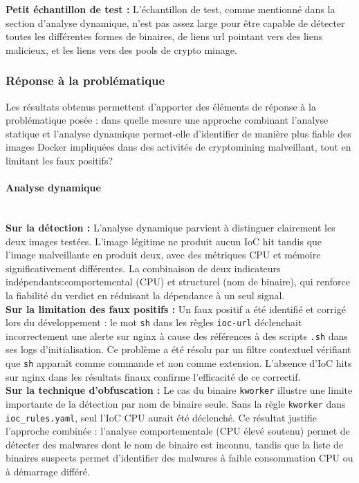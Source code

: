 \noindent \textbf{Petit échantillon de test :} L'échantillon de test, comme mentionné dans la section d'analyse dynamique, n'est pas assez large pour être capable de détecter toutes les différentes formes de binaires, de liens url pointant vers des liens malicieux, et les liens vers des pools de crypto minage. \\
\subsubsection{Réponse à la problématique}
Les résultats obtenus permettent d'apporter des éléments de réponse à la problématique posée : dans quelle mesure une approche combinant l'analyse statique et l'analyse dynamique permet-elle d'identifier de manière plus fiable des images Docker impliquées dans des activités de cryptomining malveillant, tout en limitant les faux positifs?

\noindent \paragraph{Analyse dynamique} \mbox{} \\
\noindent \textbf{Sur la détection :} L'analyse dynamique parvient à distinguer clairement les deux images testées. L'image légitime ne produit aucun IoC hit tandis que l'image malveillante en produit deux, avec des métriques CPU et mémoire significativement différentes. La combinaison de deux indicateurs indépendants:comportemental (CPU) et structurel (nom de binaire), qui renforce la fiabilité du verdict en réduisant la dépendance à un seul signal. \\

\noindent \textbf{Sur la limitation des faux positifs :} Un faux positif a été identifié et corrigé lors du développement : le mot \texttt{sh} dans les règles \texttt{ioc-url} déclenchait incorrectement une alerte sur nginx à cause des références à des scripts \texttt{.sh} dans ses logs d'initialisation. Ce problème a été résolu par un filtre contextuel vérifiant que \texttt{sh} apparaît comme commande et non comme extension. L'absence d'IoC hits sur nginx dans les résultats finaux confirme l'efficacité de ce correctif. \\

\noindent \textbf{Sur la technique d'obfuscation :} Le cas du binaire \texttt{kworker} illustre une limite importante de la détection par nom de binaire seule. Sans la règle \texttt{kworker} dans \texttt{ioc\_rules.yaml}, seul l'IoC CPU aurait été déclenché. Ce résultat justifie l'approche combinée : l'analyse comportementale (CPU élevé soutenu) permet de détecter des malwares dont le nom de binaire est inconnu, tandis que la liste de binaires suspects permet d'identifier des malwares à faible consommation CPU ou à démarrage différé.

